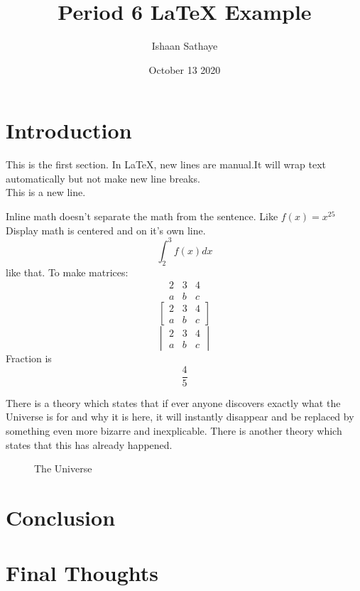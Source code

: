 \documentclass{article}
\title{Period 6 LaTeX Example}
\author{Ishaan Sathaye }
\date{October 13 2020}
\begin{document}

\maketitle %

\section{Introduction}%
This is the first section. In LaTeX, new lines are manual.It will wrap text automatically but not make new line breaks.\\ 
This is a new line.

Inline math doesn't separate the math from the sentence. Like $f(x)=x^25$\\
Display math is centered and on it's own line. $$\int_2^3{f(x)dx}$$ like that.
To make matrices:
$$
\begin{matrix}
2 & 3 & 4 \\
a & b & c
\end{matrix}
$$
$$
\begin{bmatrix}
2 & 3 & 4 \\
a & b & c
\end{bmatrix}
$$
$$
\begin{vmatrix}
2 & 3 & 4 \\
a & b & c
\end{vmatrix}
$$
Fraction is $$\frac{4}{5}$$

There is a theory which states that if ever anyone discovers exactly what the Universe is for and why it is here, it will instantly disappear and be replaced by something even more bizarre and inexplicable.
There is another theory which states that this has already happened.

\begin{figure}[h!]
\centering
\caption{The Universe}
\label{fig:universe}
\end{figure}

\section{Conclusion}

\section{Final Thoughts}



\end{document}
